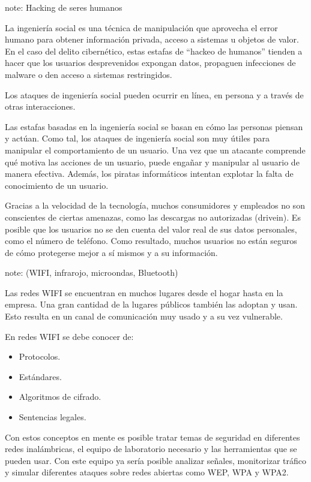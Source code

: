 \documentclass[letterpaper,10pt,spanish]{sphinxmanual}
\begin{document}
\begin{sphinxadmonition}{note}{: Hacking de seres humanos}

\sphinxAtStartPar
La ingeniería social es una técnica de manipulación que aprovecha el error humano para obtener información privada, acceso a sistemas u objetos de valor. En el caso del delito cibernético, estas estafas de “hackeo de humanos” tienden a hacer que los usuarios desprevenidos expongan datos, propaguen infecciones de malware o den acceso a sistemas restringidos.

\sphinxAtStartPar
Los ataques de ingeniería social pueden ocurrir en línea, en persona y a través de otras interacciones.

\sphinxAtStartPar
Las estafas basadas en la ingeniería social se basan en cómo las personas piensan y actúan. Como tal, los ataques de ingeniería social son muy útiles para manipular el comportamiento de un usuario. Una vez que un atacante comprende qué motiva las acciones de un usuario, puede engañar y manipular al usuario de manera efectiva. Además, los piratas informáticos intentan explotar la falta de conocimiento de un usuario.

\sphinxAtStartPar
Gracias a la velocidad de la tecnología, muchos consumidores y empleados no son conscientes de ciertas amenazas, como las descargas no autorizadas (drive\sphinxhyphen{}in). Es posible que los usuarios no se den cuenta del valor real de sus datos personales, como el número de teléfono. Como resultado, muchos usuarios no están seguros de cómo protegerse mejor a sí mismos y a su información.
\end{sphinxadmonition}

\begin{sphinxadmonition}{note}{: (WIFI, infrarojo, microondas, Bluetooth)}

\sphinxAtStartPar
Las redes WIFI se encuentran en muchos lugares desde el hogar hasta en la empresa. Una gran cantidad de la lugares públicos también las adoptan y usan. Esto resulta en un canal de comunicación muy usado y a su vez vulnerable.

\sphinxAtStartPar
En redes WIFI se debe conocer de:
\begin{itemize}
\item {} 
\sphinxAtStartPar
Protocolos.

\item {} 
\sphinxAtStartPar
Estándares.

\item {} 
\sphinxAtStartPar
Algoritmos de cifrado.

\item {} 
\sphinxAtStartPar
Sentencias legales.

\end{itemize}

\sphinxAtStartPar
Con estos conceptos en mente es posible tratar temas de seguridad en diferentes redes inalámbricas, el equipo de laboratorio necesario y las herramientas que se pueden usar. Con este equipo ya sería posible analizar señales, monitorizar tráfico y simular diferentes ataques sobre redes abiertas como WEP, WPA y WPA2.
\end{sphinxadmonition}
\end{document}
